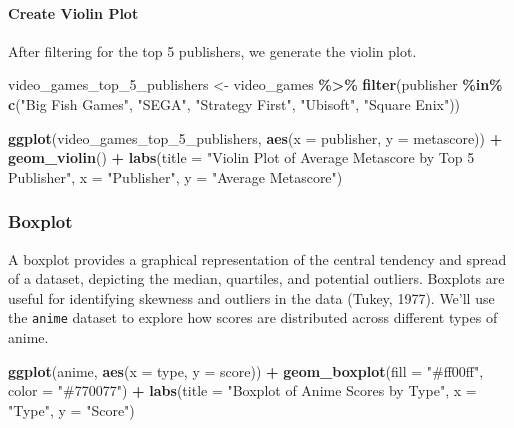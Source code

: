 \documentclass[
]{book}
\newenvironment{Shaded}{\begin{snugshade}}{\end{snugshade}}
\newcommand{\AttributeTok}[1]{\textcolor[rgb]{0.13,0.29,0.53}{#1}}
\newcommand{\FunctionTok}[1]{\textcolor[rgb]{0.13,0.29,0.53}{\textbf{#1}}}
\newcommand{\NormalTok}[1]{#1}
\newcommand{\OtherTok}[1]{\textcolor[rgb]{0.56,0.35,0.01}{#1}}
\newcommand{\SpecialCharTok}[1]{\textcolor[rgb]{0.81,0.36,0.00}{\textbf{#1}}}
\newcommand{\StringTok}[1]{\textcolor[rgb]{0.31,0.60,0.02}{#1}}
\begin{document}
\paragraph*{Create Violin Plot}\label{create-violin-plot}

After filtering for the top 5 publishers, we generate the violin plot.

\begin{Shaded}
\begin{Highlighting}[]
\NormalTok{video\_games\_top\_5\_publishers }\OtherTok{\textless{}{-}}\NormalTok{ video\_games }\SpecialCharTok{\%\textgreater{}\%}
  \FunctionTok{filter}\NormalTok{(publisher }\SpecialCharTok{\%in\%} \FunctionTok{c}\NormalTok{(}\StringTok{"Big Fish Games"}\NormalTok{, }\StringTok{"SEGA"}\NormalTok{, }\StringTok{"Strategy First"}\NormalTok{, }\StringTok{"Ubisoft"}\NormalTok{, }\StringTok{"Square Enix"}\NormalTok{))}

\FunctionTok{ggplot}\NormalTok{(video\_games\_top\_5\_publishers, }\FunctionTok{aes}\NormalTok{(}\AttributeTok{x =}\NormalTok{ publisher, }\AttributeTok{y =}\NormalTok{ metascore)) }\SpecialCharTok{+}
  \FunctionTok{geom\_violin}\NormalTok{() }\SpecialCharTok{+}
  \FunctionTok{labs}\NormalTok{(}\AttributeTok{title =} \StringTok{"Violin Plot of Average Metascore by Top 5 Publisher"}\NormalTok{,}
       \AttributeTok{x =} \StringTok{"Publisher"}\NormalTok{,}
       \AttributeTok{y =} \StringTok{"Average Metascore"}\NormalTok{)}
\end{Highlighting}
\end{Shaded}

\subsubsection*{Boxplot}\label{boxplot}

A boxplot provides a graphical representation of the central tendency and spread of a dataset, depicting the median, quartiles, and potential outliers. Boxplots are useful for identifying skewness and outliers in the data (Tukey, 1977). We'll use the \texttt{anime} dataset to explore how scores are distributed across different types of anime.

\begin{Shaded}
\begin{Highlighting}[]
\FunctionTok{ggplot}\NormalTok{(anime, }\FunctionTok{aes}\NormalTok{(}\AttributeTok{x =}\NormalTok{ type, }\AttributeTok{y =}\NormalTok{ score)) }\SpecialCharTok{+}
  \FunctionTok{geom\_boxplot}\NormalTok{(}\AttributeTok{fill =} \StringTok{"\#ff00ff"}\NormalTok{, }\AttributeTok{color =} \StringTok{"\#770077"}\NormalTok{) }\SpecialCharTok{+}
  \FunctionTok{labs}\NormalTok{(}\AttributeTok{title =} \StringTok{"Boxplot of Anime Scores by Type"}\NormalTok{,}
       \AttributeTok{x =} \StringTok{"Type"}\NormalTok{,}
       \AttributeTok{y =} \StringTok{"Score"}\NormalTok{)}
\end{Highlighting}
\end{Shaded}
\end{document}
